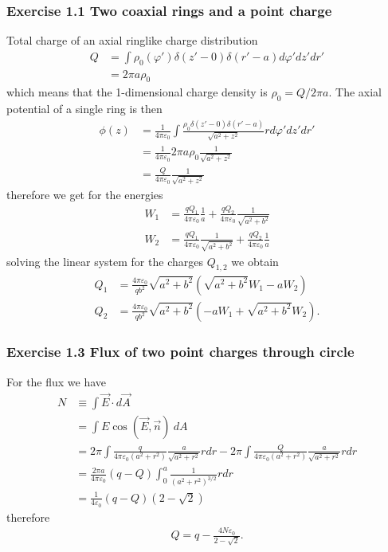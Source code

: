 \documentclass[10pt,a4paper]{article}
\theoremstyle{definition}
\begin{document}
\subsubsection{Exercise 1.1 Two coaxial rings and a point charge}
Total charge of an axial ringlike charge distribution
\begin{align}
    Q&=\int \rho_0(\varphi')\delta(z'-0)\delta(r'-a) d\varphi' dz' dr'\\
    &=2\pi a\rho_0
\end{align}
which means that the 1-dimensional charge density is $\rho_0=Q/2\pi a$.
The axial potential of a single ring is then
\begin{align}
    \phi(z)&=\frac{1}{4\pi\varepsilon_0}\int\frac{\rho_0\delta(z'-0)\delta(r'-a)}{\sqrt{a^2+z^2}}r d\varphi' dz' dr'\\
    &=\frac{1}{4\pi\varepsilon_0}2\pi a \rho_0\frac{1}{\sqrt{a^2+z^2}}\\
    &=\frac{Q}{4\pi\varepsilon_0}\frac{1}{\sqrt{a^2+z^2}}
\end{align}
therefore we get for the energies
\begin{align}
    W_1&=\frac{qQ_1}{4\pi\varepsilon_0}\frac{1}{a}+\frac{qQ_2}{4\pi\varepsilon_0}\frac{1}{\sqrt{a^2+b^2}}\\
    W_2&=\frac{qQ_1}{4\pi\varepsilon_0}\frac{1}{\sqrt{a^2+b^2}}+\frac{qQ_2}{4\pi\varepsilon_0}\frac{1}{a}
\end{align}
solving the linear system for the charges $Q_{1,2}$ we obtain
\begin{align}
    Q_1&=\frac{4\pi\varepsilon_0}{qb^2}\sqrt{a^2+b^2}\left(\sqrt{a^2+b^2}W_1-aW_2\right)\\
    Q_2&=\frac{4\pi\varepsilon_0}{qb^2}\sqrt{a^2+b^2}\left(-aW_1+\sqrt{a^2+b^2}W_2\right).
\end{align}

\subsubsection{Exercise 1.3 Flux of two point charges through circle}
For the flux we have
\begin{align}
    N&\equiv\int\vec{E}\cdot d\vec{A}\\
    &=\int E \cos(\vec{E},\vec{n})\ dA\\
    &=2\pi\int\frac{q}{4\pi\varepsilon_0(a^2+r^2)}\frac{a}{\sqrt{a^2+r^2}}rdr-2\pi\int\frac{Q}{4\pi\varepsilon_0(a^2+r^2)}\frac{a}{\sqrt{a^2+r^2}}rdr\\
    &=\frac{2\pi a}{4\pi\varepsilon_0}(q-Q)\int_0^a\frac{1}{(a^2+r^2)^{3/2}}rdr\\
    &=\frac{1}{4\varepsilon_0}(q-Q)\left(2-\sqrt{2}\right)
\end{align}
therefore
\begin{align}
    Q=q-\frac{4N\varepsilon_0}{2-\sqrt{2}}.
\end{align}
\end{document}
